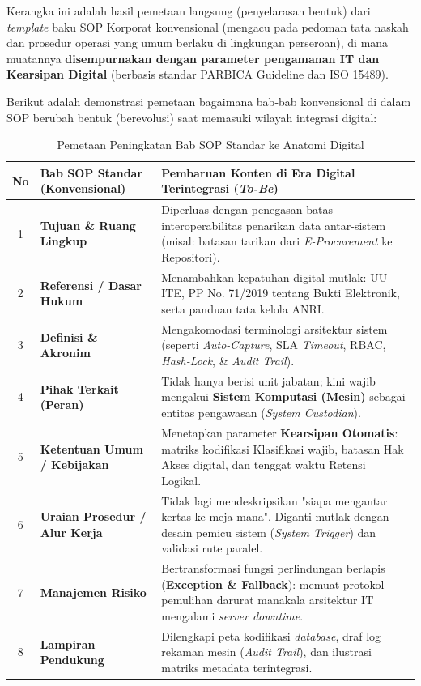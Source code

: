 \documentclass[12pt,a4paper]{report}
\begin{document}
Kerangka ini adalah hasil pemetaan langsung (penyelarasan bentuk) dari \textit{template} baku SOP Korporat konvensional (mengacu pada pedoman tata naskah dan prosedur operasi yang umum berlaku di lingkungan perseroan), di mana muatannya \textbf{disempurnakan dengan parameter pengamanan IT dan Kearsipan Digital} (berbasis standar PARBICA Guideline dan ISO 15489).

Berikut adalah demonstrasi pemetaan bagaimana bab-bab konvensional di dalam SOP berubah bentuk (berevolusi) saat memasuki wilayah integrasi digital:

\begin{table}[H]
\centering
\small
\caption{Pemetaan Peningkatan Bab SOP Standar ke Anatomi Digital}
\begin{tabularx}{\textwidth}{@{} c >{\raggedright\arraybackslash}p{4.2cm} >{\raggedright\arraybackslash}X @{}}
\toprule
\textbf{No} & \textbf{Bab SOP Standar (Konvensional)} & \textbf{Pembaruan Konten di Era Digital Terintegrasi (\textit{To-Be})} \\
\midrule
1 & \textbf{Tujuan \& Ruang Lingkup} & Diperluas dengan penegasan batas interoperabilitas penarikan data antar-sistem (misal: batasan tarikan dari \textit{E-Procurement} ke Repositori). \\
2 & \textbf{Referensi / Dasar Hukum} & Menambahkan kepatuhan digital mutlak: UU ITE, PP No. 71/2019 tentang Bukti Elektronik, serta panduan tata kelola ANRI. \\
3 & \textbf{Definisi \& Akronim} & Mengakomodasi terminologi arsitektur sistem (seperti \textit{Auto-Capture}, SLA \textit{Timeout}, RBAC, \textit{Hash-Lock}, \& \textit{Audit Trail}). \\
4 & \textbf{Pihak Terkait (Peran)} & Tidak hanya berisi unit jabatan; kini wajib mengakui \textbf{Sistem Komputasi (Mesin)} sebagai entitas pengawasan (\textit{System Custodian}). \\
5 & \textbf{Ketentuan Umum / Kebijakan} & Menetapkan parameter \textbf{Kearsipan Otomatis}: matriks kodifikasi Klasifikasi wajib, batasan Hak Akses digital, dan tenggat waktu Retensi Logikal. \\
6 & \textbf{Uraian Prosedur / Alur Kerja} & Tidak lagi mendeskripsikan "siapa mengantar kertas ke meja mana". Diganti mutlak dengan desain pemicu sistem (\textit{System Trigger}) dan validasi rute paralel. \\
7 & \textbf{Manajemen Risiko} & Bertransformasi fungsi perlindungan berlapis (\textbf{Exception \& Fallback}): memuat protokol pemulihan darurat manakala arsitektur IT mengalami \textit{server downtime}. \\
8 & \textbf{Lampiran Pendukung} & Dilengkapi peta kodifikasi \textit{database}, draf log rekaman mesin (\textit{Audit Trail}), dan ilustrasi matriks metadata terintegrasi. \\
\bottomrule
\end{tabularx}
\end{table}
\end{document}
